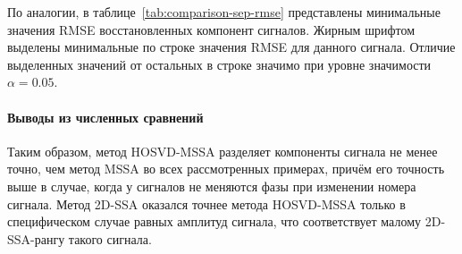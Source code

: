 \documentclass[specialist,
  substylefile=spbu.rtx,
subf,href,colorlinks=true, 12pt]{disser}
\theoremstyle{plain}
\theoremstyle{definition}
\theoremstyle{remark}
\begin{document}
По аналогии, в таблице~\ref{tab:comparison-sep-rmse} представлены минимальные значения RMSE восстановленных
компонент сигналов.
Жирным шрифтом выделены минимальные по строке значения RMSE для данного сигнала.
Отличие выделенных значений от остальных в строке значимо при уровне значимости $\alpha=0.05$.

\paragraph{Выводы из численных сравнений}\label{par:numerical-comparison-sep-res}
Таким образом, метод HOSVD-MSSA разделяет компоненты сигнала не менее точно, чем метод MSSA во всех
рассмотренных примерах, причём его точность выше в случае, когда у сигналов не меняются фазы при
изменении номера сигнала.
Метод 2D-SSA оказался точнее метода HOSVD-MSSA только в специфическом случае равных амплитуд сигнала,
что соответствует малому 2D-SSA-рангу такого сигнала.
\end{document}
